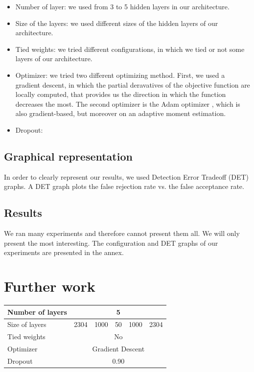 \documentclass[conference]{IEEEtran}
\begin{document}
\begin{itemize}
\item{Number of layer}: we used from 3 to 5 hidden layers in our architecture.
\item{Size of the layers}: we used different sizes of the hidden layers of our architecture.
\item{Tied weights}: we tried different configurations, in which we tied or not some layers of our architecture.
\item{Optimizer}: we tried two different optimizing method. First, we used a gradient descent, in which the partial deravatives of the objective function are locally computed, that provides us the direction in which the function decreases the most. The second optimizer is the Adam optimizer \cite{DBLP:journals/corr/KingmaB14}, which is also gradient-based, but moreover on an adaptive moment estimation.
\item{Dropout}: 
\end{itemize}


\subsection{Graphical representation}

In order to clearly represent our results, we used Detection Error Tradeoff (DET) graphs. A DET graph plots the false rejection rate vs. the false acceptance rate. 

\subsection{Results}

We ran many experiments and therefore cannot present them all. We will only present the most interesting. The configuration and DET graphs of our experiments are presented in the annex.

\section{Further work}


\printbibliography

\newpage

\appendix

\begin{table}[!h]
\centering
\begin{tabular}{|l|c|c|c|c|c|}
\hline
Number of layers & \multicolumn{5}{c|}{5}                \\ \hline
Size of layers   & 2304   & 1000   & 50  & 1000  & 2304  \\ \hline
Tied weights     & \multicolumn{5}{c|}{No}               \\ \hline
Optimizer        & \multicolumn{5}{c|}{Gradient Descent} \\ \hline
Dropout          & \multicolumn{5}{c|}{0.90} \\ \hline
\end{tabular}
\end{table}
\end{document}
